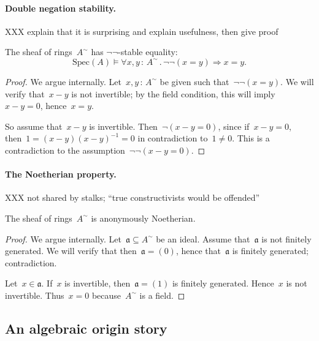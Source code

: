 \documentclass{ws-rv9x6}
\newcommand{\aaa}{\mathfrak{a}}
\newcommand{\Spec}{\mathrm{Spec}}
\renewcommand{\_}{\mathpunct{.}}
\newcommand{\?}{\,{:}\,}
\begin{document}
\paragraph{Double negation stability.}
XXX explain that it is surprising and explain usefulness, then give proof

\begin{proposition}The sheaf of rings~$A^\sim$ has $\neg\neg$-stable equality:
\[ \Spec(A) \models \forall x,y\?A^\sim\_ \neg\neg(x = y) \Rightarrow x = y. \]
\end{proposition}

\begin{proof}We argue internally. Let~$x,y \? A^\sim$ be given such
that~$\neg\neg(x = y)$. We will verify that~$x - y$ is not invertible; by the
field condition, this will imply~$x - y = 0$, hence~$x = y$.

So assume that~$x - y$ is invertible. Then~$\neg(x - y = 0)$, since if~$x - y =
0$, then~$1 = (x-y) (x-y)^{-1} = 0$ in contradiction to~$1 \neq 0$. This is a
contradiction to the assumption~$\neg\neg(x-y=0)$.\end{proof}


\paragraph{The Noetherian property.}
XXX not shared by stalks; ``true constructivists would be offended''

\begin{proposition}The sheaf of rings~$A^\sim$ is anonymously
Noetherian.\end{proposition}

\begin{proof}We argue internally. Let~$\aaa \subseteq A^\sim$ be an ideal.
Assume that~$\aaa$ is not finitely generated. We will verify that then~$\aaa =
(0)$, hence that~$\aaa$ is finitely generated; contradiction.

Let~$x \in \aaa$. If~$x$ is invertible, then~$\aaa = (1)$ is finitely
generated. Hence~$x$ is not invertible. Thus~$x = 0$ because~$A^\sim$ is a
field.
\end{proof}


\subsection{An algebraic origin story}
\label{sect:origins}
\end{document}
